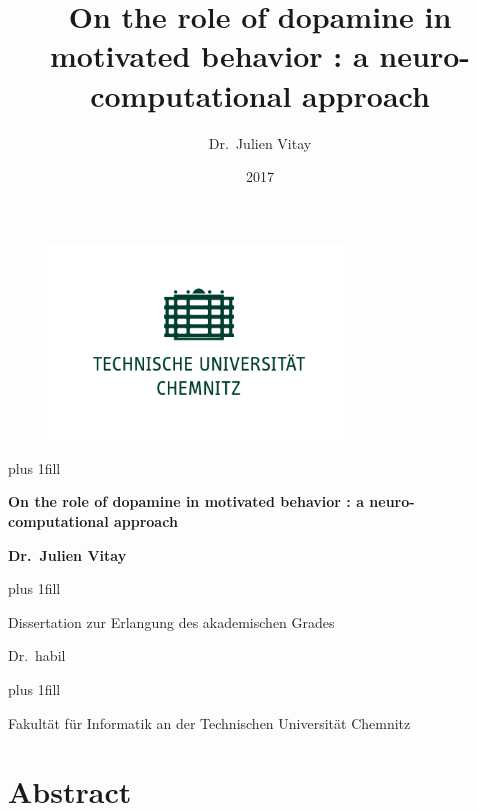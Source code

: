 \documentclass[
  11pt,
  a4paper,
]{scrbook}
\title{On the role of dopamine in motivated behavior : a
neuro-computational approach}
\author{Dr.~Julien Vitay}
\date{2017}
\renewcommand*\contentsname{Table of contents}
\newcommand\contentsname{Table of contents}
\begin{document}
    \frontmatter

    \cleardoublepage
    \thispagestyle{empty}

    {\centering

        \begin{figure}[h!]
            \begin{center}
                \includegraphics[width=8cm]{img/tuc.png}
            \end{center}
        \end{figure}
        
        \hbox{}\vskip 0cm plus 1fill
        
        {\Huge\bfseries On the role of dopamine in motivated behavior :
a neuro-computational approach \par}
        
                
        \vspace{12ex}
                    {\LARGE\bfseries Dr.~Julien Vitay \par}
            
        \vskip 0cm plus 1fill

        {\large Dissertation zur Erlangung des akademischen Grades}
        
        \vspace{3ex}
            
        {\Large Dr.~habil \par}
        
        \vskip 0cm plus 1fill         
            
        {\large Fakultät für Informatik an der Technischen Universität
Chemnitz \par}
        

    }

\cleardoublepage
\renewcommand*\contentsname{Table of contents}
{
\hypersetup{linkcolor=}
\setcounter{tocdepth}{2}
\tableofcontents
}
\mainmatter
{}

\chapter*{Abstract}\label{abstract}
\end{document}
